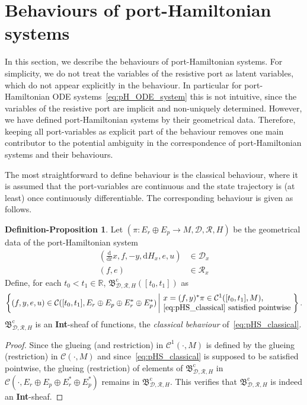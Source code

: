 \documentclass[preprint,12pt]{elsarticle}
\theoremstyle{definition}
\newtheorem{definition-proposition}[theorem]{Definition-Proposition}
\newcommand{\set}[1]{\left\lbrace #1\right\rbrace}
\begin{document}
\section{Behaviours of port-Hamiltonian systems}

In this section, we describe the behaviours of port-Hamiltonian systems. For simplicity, we do not treat the variables of the resistive port as latent variables, which do not appear explicitly in the behaviour. In particular for port-Hamiltonian ODE systems~\eqref{eq:pH_ODE_system} this is not intuitive, since the variables of the resistive port are implicit and non-uniquely determined. However, we have defined port-Hamiltonian systems by their geometrical data. Therefore, keeping all port-variables as explicit part of the behaviour removes one main contributor to the potential ambiguity in the correspondence of port-Hamiltonian systems and their behaviours.

The most straightforward to define behaviour is the classical behaviour, where it is assumed that the port-variables are continuous and the state trajectory is (at least) once continuously differentiable. The corresponding behaviour is given as follows.

\begin{definition-proposition}
Let $(\pi:E_r\oplus E_p\to M,\mathcal{D},\mathcal{R},H)$ be the geometrical data of the port-Hamiltonian system
\begin{equation}\label{eq:pHS_classical}
\begin{aligned}
\left(\tfrac{\mathrm{d}}{\mathrm{d}t}x,f,-y,\mathrm{d}H_x,e,u\right) & \in\mathcal{D}_x\\
(f,e) & \in\mathcal{R}_x
\end{aligned}
\end{equation}
Define, for each $t_0<t_1\in\mathbb{R}$, $\mathfrak{B}^{\mathrm{c}}_{\mathcal{D},\mathcal{R},H}([t_0,t_1])$ as
\begin{align*}
\set{(f,y,e,u)\in\mathcal{C}([t_0,t_1],E_r\oplus E_p\oplus E_r^*\oplus E_p^*)\left\vert\!\begin{array}{l}
x = (f,y)^*\pi\in\mathcal{C}^1([t_0,t_1],M),\\
\eqref{eq:pHS_classical}~\mathrm{satisfied~pointwise}
\end{array}\right.\!\!}.
\end{align*}
$\mathfrak{B}^{\mathrm{c}}_{\mathcal{D},\mathcal{R},H}$ is an \textbf{Int}-sheaf of functions, the \textit{classical behaviour} of~\eqref{eq:pHS_classical}.
\end{definition-proposition}
\begin{proof}
Since the glueing (and restriction) in $\mathcal{C}^1(\cdot,M)$ is defined by the glueing (restriction) in $\mathcal{C}(\cdot,M)$ and since~\eqref{eq:pHS_classical} is supposed to be satisfied pointwise, the glueing (restriction) of elements of $\mathfrak{B}^{\mathrm{c}}_{\mathcal{D},\mathcal{R},H}$ in $\mathcal{C}(\cdot,E_r\oplus E_p\oplus E_r^*\oplus E_p^*)$ remains in $\mathfrak{B}^{\mathrm{c}}_{\mathcal{D},\mathcal{R},H}$. This verifies that $\mathfrak{B}^{\mathrm{c}}_{\mathcal{D},\mathcal{R},H}$ is indeed an \textbf{Int}-sheaf.
\end{proof}
\end{document}
